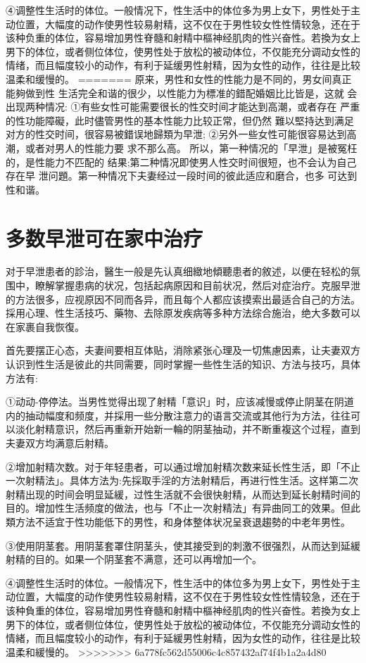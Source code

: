 \documentclass[12pt,UTF8]{ctexbook}
\begin{document}
④调整性生活时的体位。一般情况下，性生活中的体位多为男上女下，男性处于主动位置，大幅度的动作使男性较易射精，这不仅在于男性较女性性情较急，还在于该种负重的体位，容易增加男性脊髓和射精中樞神经肌肉的性兴奋性。若換为女上男下的体位，或者侧位体位，使男性处于放松的被动体位，不仅能充分调动女性的情绪，而且幅度较小的动作，有利于延缓男性射精，因为女性的动作，往往是比较温柔和缓慢的。
=======
原来，男性和女性的性能力是不同的，男女间真正能夠做到性
生活完全和谐的很少，以性能力为標准的錯配婚姻比比皆是，这就
会出现两种情况:
①有些女性可能需要很长的性交时间才能达到高潮，或者存在
严重的性功能障礙，此时儘管男性的基本性能力比较正常，但仍然
難以堅持达到满足对方的性交时间，很容易被錯误地歸類为早泄;
②另外一些女性可能很容易达到高潮，或者对男人的性能力要
求不那么高。
所以，第一种情况的「早泄」是被冤枉的，是性能力不匹配的
结果;第二种情况即使男人性交时间很短，也不会认为自己存在早
泄问題。第一种情况下夫妻经过一段时间的彼此适应和磨合，也多
可达到性和谐。

\section{多数早泄可在家中治疗}

对于早泄患者的診治，醫生一般是先认真细緻地傾聽患者的敘述，以便在轻松的氛围中，瞭解掌握患病的状况，包括起病原因和目前状况，然后对症治疗。克服早泄的方法很多，应视原因不同而各异，而且每个人都应该摸索出最适合自己的方法。採用心理、性生活技巧、藥物、去除原发疾病等多种方法综合施治，绝大多数可以在家裹自我恢復。

首先要摆正心态，夫妻间要相互体贴，消除紧张心理及一切焦慮因素，让夫妻双方认识到性生活是彼此的共同需要，同时掌握一些性生活的知识、方法与技巧，具体方法有:

①动动-停停法。当男性觉得出现了射精「意识」时，应该减慢或停止阴茎在阴道内的抽动幅度和频度，并採用一些分散注意力的语言交流或其他行为方法，往往可以淡化射精意识，然后再重新开始新一輪的阴茎抽动，并不断重複这个过程，直到夫妻双方均满意后射精。

②增加射精次数。对于年轻患者，可以通过增加射精次数来延长性生活，即「不止一次射精法」。具体方法为:先採取手淫的方法射精后，再进行性生活。这样第二次射精出现的时间会明显延緩，过性生活就不会很快射精，从而达到延长射精时间的目的。增加性生活频度的做法，也与「不止一次射精法」有异曲同工的效果。但此類方法不适宜于性功能低下的男性，和身体整体状况呈衰退趨勢的中老年男性。

③使用阴茎套。用阴茎套罩住阴茎头，使其接受到的刺激不很强烈，从而达到延緩射精的目的。如果一个阴茎套不满意，还可以再增加一个。

④调整性生活时的体位。一般情况下，性生活中的体位多为男上女下，男性处于主动位置，大幅度的动作使男性较易射精，这不仅在于男性较女性性情较急，还在于该种負重的体位，容易增加男性脊髓和射精中樞神经肌肉的性兴奋性。若換为女上男下的体位，或者侧位体位，使男性处于放松的被动体位，不仅能充分调动女性的情緒，而且幅度较小的动作，有利于延緩男性射精，因为女性的动作，往往是比较温柔和緩慢的。
>>>>>>> 6a778fc562d55006c4c857432af74f4b1a2a4d80
\end{document}
